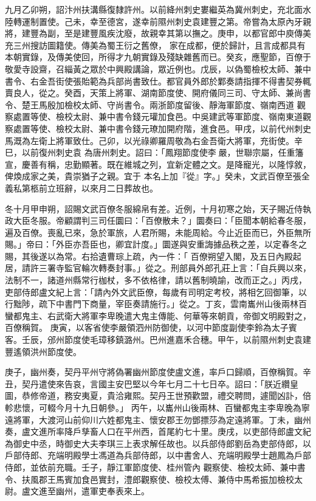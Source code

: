 \begin{pinyinscope}
九月乙卯朔，詔汴州扶溝縣復隸許州。以前絳州刺史婁繼英為冀州刺史，充北面水陸轉運制置使。己未，幸至德宮，遂幸前隰州刺史袁建豐之第。帝嘗為太原內牙親將，建豐為副，至是建豐風疾沈廢，故親幸其第以撫之。庚申，以都官郎中庾傳美充三州搜訪圖籍使。傳美為蜀王衍之舊僚，
 家在成都，便於歸計，且言成都具有本朝實錄，及傳美使回，所得才九朝實錄及殘缺雜舊而已。癸亥，應聖節，百僚于敬愛寺設齋，召緇黃之眾於中興殿講論，眾近例也。戊辰，以偽蜀檢校太師、兼中書令、右金吾街使張貽範為兵部尚書致仕。都官員外郎於鄴奏請指揮不得書契券輒賣良人，從之。癸酉，天策上將軍、湖南節度使、開府儀同三司、守太師、兼尚書令、楚王馬殷加檢校太師、守尚書令。兩浙節度留後、靜海軍節度、嶺南西道
 觀察處置等使、檢校太尉、兼中書令錢元瓘加食邑。中吳建武等軍節度、嶺南東道觀察處置等使、檢校太尉、兼中書令錢元璙加開府階，進食邑。甲戌，以前代州刺史馬溉為左衛上將軍致仕。己卯，以光祿卿羅周敬為右金吾衛大將軍，充街使。辛巳，以前復州刺史袁
 為唐州刺史。詔曰：「鳳翔節度使李嚴，世聯宗屬，任重籓宣，慶善有稱，忠勤顯著。既在維城之列，宜新定體之文。是降寵光，以隆惇敘，俾煥成家之美，貴崇猶子之親。宜于
 本名上加『從』字。」癸未，文武百僚至張全義私第柩前立班辭，以來月二日葬故也。



 冬十月甲申朔，詔賜文武百僚冬服綿帛有差。近例，十月初寒之始，天子賜近侍執政大臣冬服。帝顧謂判三司任圜曰：「百僚散未？」圜奏曰：「臣聞本朝給春冬服，遍及百僚。喪亂已來，急於軍旅，人君所賜，未能周給。今止近臣而已，外臣無所賜。」帝曰：「外臣亦吾臣也，卿宜計度。」圜遂與安重誨據品秩之差，以定春冬之賜，其後遂以為常。右拾遺曹琮上疏，內一件：「
 百僚朔望入閣，及五日內殿起居，請許三署寺監官輪次轉奏封事。」從之。刑部員外郎孔莊上言：「自兵興以來，法制不一，諸道州縣常行枷杖，多不依格律，請以舊制曉諭，改而正之。」丙戌，吏部侍郎盧文紀上言：「請內外文武臣僚，每歲有司明定考校，將相乞回御筆，以行黜陟，疏下中書門下商量，宰臣奏請施行。」從之。丁亥，雲南巂州山後兩林百蠻都鬼主、右武衛大將軍李卑晚遣大鬼主傳能、何華等來朝貢，帝御文明殿對之，百僚稱賀。
 庚寅，以客省使李嚴領泗州防御使，以河中節度副使李鈴為太子賓客。壬辰，邠州節度使毛璋移鎮潞州。巴州進嘉禾合穗。甲午，以前隰州刺史袁建豐遙領洪州節度使。



 庚子，幽州奏，契丹平州守將偽署幽州節度使盧文進，率戶口歸順，百僚稱賀。辛丑，契丹遣使來告哀，言國主安巴堅以今年七月二十七日卒。詔曰：「朕近纘皇圖，恭修帝道，務安夷夏，貴洽雍熙。契丹王世預歡盟，禮交聘問，遽聞凶訃，倍軫悲懷，可輟今月十九日朝參。」
 丙午，以巂州山後兩林、百蠻都鬼主李卑晚為寧遠將軍，大渡河山前仰川六姓都鬼主、懷安郡王勿鄧摽莎為定遠將軍。丁未，幽州奏，盧文進所率降戶孳畜人口在平州西，首尾約七十里。庚戌，以吏部侍郎盧文紀為御史中丞，時御史大夫李琪三上表求解任故也。以兵部侍郎劉岳為吏部侍郎，以戶部侍郎、充端明殿學士馮道為兵部侍郎，以中書舍人、充端明殿學士趙鳳為戶部侍郎，並依前充職。壬子，靜江軍節度使、桂州管內
 觀察使、檢校太師、兼中書令、扶風郡王馬賓加食邑實封，澧郎觀察使、檢校太傅、兼侍中馬希振加檢校太尉。盧文進至幽州，遣軍吏奉表來上。




\end{pinyinscope}
